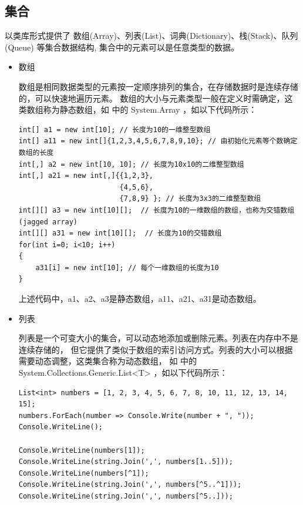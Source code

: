 \subsection{集合}

\cs 以类库形式提供了 数组(Array)、列表(List)、词典(Dictionary)、栈(Stack)、队列(Queue)
等集合数据结构, 集合中的元素可以是任意类型的数据。

\begin{itemize}
    \item 数组

          数组是相同数据类型的元素按一定顺序排列的集合，在存储数据时是连续存储的，可以快速地遍历元素。
          数组的大小与元素类型一般在定义时需确定，这类数组称为静态数组，如 \cs 中的 System.Array ，如以下代码所示：

          \begin{lstlisting}  
int[] a1 = new int[10]; // 长度为10的一维整型数组
int[] a11 = new int[]{1,2,3,4,5,6,7,8,9,10}; // 由初始化元素等个数确定数组的长度
int[,] a2 = new int[10, 10]; // 长度为10x10的二维整型数组
int[,] a21 = new int[,]{{1,2,3},
                        {4,5,6},
                        {7,8,9} }; // 长度为3x3的二维整型数组
int[][] a3 = new int[10][];  // 长度为10的一维数组的数组，也称为交错数组(jagged array)
int[][] a31 = new int[10][];  // 长度为10的交错数组
for(int i=0; i<10; i++)
{
    a31[i] = new int[10]; // 每个一维数组的长度为10
}
\end{lstlisting}

          上述代码中，a1、a2、a3是静态数组，a11、a21、a31是动态数组。

    \item 列表

          列表是一个可变大小的集合，可以动态地添加或删除元素。列表在内存中不是连续存储的，
          但它提供了类似于数组的索引访问方式。列表的大小可以根据需要动态调整，这类集合称为动态数组，
          如 \cs 中的 System.Collections.Generic.List<T> ，如以下代码所示：

          \begin{lstlisting}
List<int> numbers = [1, 2, 3, 4, 5, 6, 7, 8, 10, 11, 12, 13, 14, 15];
numbers.ForEach(number => Console.Write(number + ", "));
Console.WriteLine();

Console.WriteLine(numbers[1]);
Console.WriteLine(string.Join(',', numbers[1..5])); 
Console.WriteLine(numbers[^1]); 
Console.WriteLine(string.Join(',', numbers[^5..^1]));
Console.WriteLine(string.Join(',', numbers[^5..]));  
\end{lstlisting}


\end{itemize}
